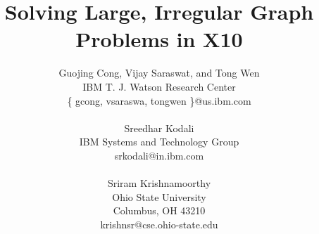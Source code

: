 \documentclass[12pt]{article}
\numberwithin{equation}{section}
\begin{document}
\title{Solving Large, Irregular Graph Problems in X10}

\author{Guojing Cong,  Vijay Saraswat, and Tong Wen\\
IBM T. J. Watson Research Center\\
 \{ gcong, vsaraswa, tongwen \}@us.ibm.com\\ 
\\
Sreedhar Kodali\\
IBM Systems and Technology Group\\
srkodali@in.ibm.com\\
\\
Sriram Krishnamoorthy \\
Ohio State University\\
Columbus, OH 43210 \\
krishnsr@cse.ohio-state.edu
}

\date{}

\maketitle
\thispagestyle{empty}













\end{document}
